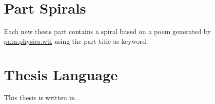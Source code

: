 \section{Part Spirals}

Each new thesis part contains a spiral based on a poem generated by \url{pata.physics.wtf} using the part title as keyword.


\section{Thesis Language}

This thesis is written in \tex.

\stopcontents[chapters]
